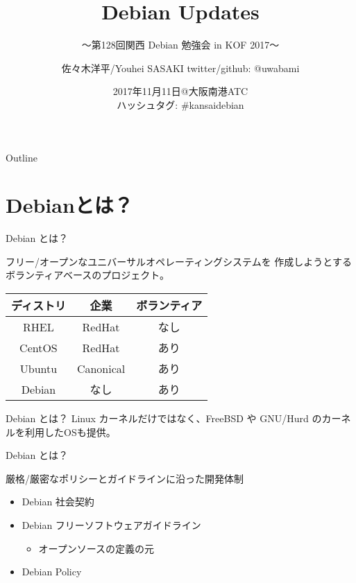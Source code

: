 \documentclass[cjk,c,squeeze,shrink,dvipdfmx,12pt]{beamer}
\title{Debian Updates}
\subtitle[第128回]{〜第128回関西 Debian 勉強会 in KOF 2017〜}
\author[佐々木]{%
  佐々木洋平/Youhei SASAKI\newline
  twitter/github: \alert{@uwabami}
}
\institute[Debian JP Project]{%
  Debian JP Project/関西Debian勉強会\\
  {\color{blue}{uwabami@debian.or.jp}}
}
\date[2017/11/11]{%
  {\tiny{2017年11月11日@大阪南港ATC}}\\
  {\footnotesize{ハッシュタグ: \alert{\#kansaidebian}}}
}
\begin{document}
\takahashi[80]{　}
{%
  \begin{frame}
    \maketitle
  \end{frame}
}

\begin{frame}[fragile]{Outline}
  \tableofcontents
\end{frame}

\section{Debianとは？}

\begin{frame}[fragile]{Debian とは？}

  \alert{フリー/オープン}な\alert{ユニバーサル}オペレーティングシステムを
  作成しようとするボランティアベースのプロジェクト。

  \vfill
  \centering
  \begin{tabular}{|c|c|c|}
    \hline
    ディストリ & 企業 & ボランティア \\ \hline
    RHEL & RedHat & なし  \\ \hline
    CentOS & RedHat & あり \\ \hline
    Ubuntu  & Canonical & あり \\ \hline
    \alert{Debian}  & \alert{なし} & \alert{あり} \\ \hline
  \end{tabular}
  \vfill
\end{frame}


\begin{frame}[fragile]{Debian とは？}
Linux カーネルだけではなく、FreeBSD や GNU/Hurd のカーネルを利用したOSも提供。

\centering
\end{frame}


\begin{frame}[fragile]{Debian とは？}

  厳格/厳密なポリシーとガイドラインに沿った開発体制
  \begin{itemize}
  \item Debian 社会契約
  \item Debian フリーソフトウェアガイドライン
    \begin{itemize}
    \item オープンソースの定義の元
    \end{itemize}
  \item Debian Policy
  \end{itemize}

\end{frame}
\end{document}
